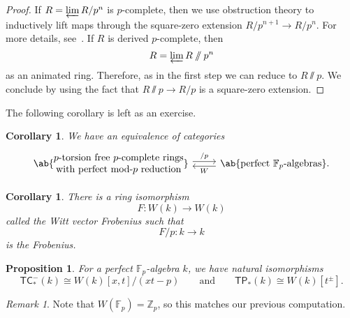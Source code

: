 \documentclass[10pt, oneside]{memoir}
\newtheorem{cor}[thm]{Corollary}
\newtheorem{prop}[thm]{Proposition}
\theoremstyle{definition}
\theoremstyle{remark}
\newtheorem{rmk}[thm]{Remark}
\theoremstyle{plain}
\theoremstyle{definition}
\theoremstyle{remark}
\newcommand{\Z}{\mathbb{Z}}
\newcommand{\F}{\mathbb{F}}
\newcommand{\ms}[1]{\mathsf{#1}}
\newcommand{\1}{\mathbf{1}}
\newcommand{\2}{\mathbf{2}}
\newcommand{\3}{\mathbf{3}}
\newcommand{\TC}{\ms{TC}}
\newcommand{\TP}{\ms{TP}}
\begin{document}
\begin{proof}
    If $R = \varprojlim R/p^n$ is $p$-complete, then we use obstruction theory to inductively lift maps through the square-zero extension $R/p^{n+1} \to R/p^n$. For more details, see~. If $R$ is derived $p$-complete, then
    \[ R = \varprojlim R\sslash p^n \]
    as an animated ring. Therefore, as in the first step we can reduce to $R \sslash p$. We conclude by using the fact that $R \sslash p \to R/p$ is a square-zero extension.
\end{proof}

The following corollary is left as an exercise.
\begin{cor}
    We have an equivalence of categories
    \begin{equation*}
    \begin{tikzcd}
        \ab\{ \Centerstack{{$p$-torsion free $p$-complete rings} {with perfect mod-$p$ reduction}} \} \ar[shift left=1]{r}{/p} & \ab\{\text{perfect $\F_p$-algebras} \} \ar[shift left=1]{l}{W}.
    \end{tikzcd}
    \end{equation*}
\end{cor}

\begin{cor}
    There is a ring isomorphism
    \[ F \colon W(k) \to W(k) \]
    called the \textit{Witt vector Frobenius} such that
    \[ F/p \colon k \to k \]
    is the Frobenius.
\end{cor}

\begin{prop}
    For a perfect $\F_p$-algebra $k$, we have natural isomorphisms
    \[ \TC_*^-(k) \cong W(k)[x,t]/(xt-p) \qquad \text{and} \qquad \TP_*(k) \cong W(k)[t^{\pm}]. \]
\end{prop}

\begin{rmk}
    Note that $W(\F_p) = \Z_p$, so this matches our previous computation.
\end{rmk}
\end{document}
